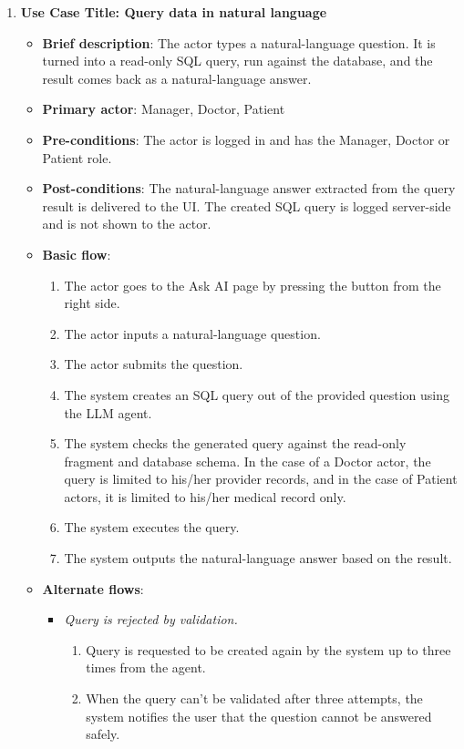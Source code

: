 \begin{enumerate}
\item \textbf{Use Case Title: Query data in natural language}
\begin{itemize}
    \item \textbf{Brief description}: The actor types a natural-language question. It is turned into a read-only SQL query, run against the database, and the result comes back as a natural-language answer.
    \item \textbf{Primary actor}: Manager, Doctor, Patient
    \item \textbf{Pre-conditions}: The actor is logged in and has the Manager, Doctor or Patient role.
    \item \textbf{Post-conditions}: The natural-language answer extracted from the query result is delivered to the UI. The created SQL query is logged server-side and is not shown to the actor.
    \item \textbf{Basic flow}:
    \begin{enumerate}
        \item The actor goes to the Ask AI page by pressing the button from the right side.
        \item The actor inputs a natural-language question.
        \item The actor submits the question.
        \item The system creates an SQL query out of the provided question using the LLM agent.
        \item The system checks the generated query against the read-only fragment and database schema. In the case of a Doctor actor, the query is limited to his/her provider records, and in the case of Patient actors, it is limited to his/her medical record only.
        \item The system executes the query.
        \item The system outputs the natural-language answer based on the result.
    \end{enumerate}
    \item \textbf{Alternate flows}:
    \begin{itemize}
        \item[5a.] \textit{Query is rejected by validation.}
        \begin{enumerate}
            \item Query is requested to be created again by the system up to three times from the agent.
            \item When the query can’t be validated after three attempts, the system notifies the user that the question cannot be answered safely.
        \end{enumerate}
    \end{itemize}
\end{itemize}

\end{enumerate}

